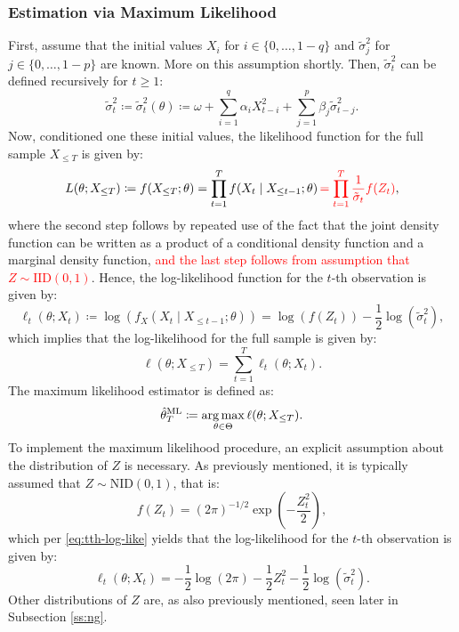 \subsubsection{Estimation via Maximum Likelihood}
First, assume that the initial values $X_{i}$ for $i\in\{0,\dots,1-q\}$ and $\tilde{\sigma}_{j}^{2}$ for $j\in\{0,\dots,1-p\}$ are known. More on this assumption shortly. Then, $\tilde{\sigma}_{t}^{2}$ can be defined recursively for $t\geq 1$:
\begin{equation}\label{eq:est-sigma}
    \tilde{\sigma}_{t}^{2}\coloneqq\tilde{\sigma}_{t}^{2}(\theta)\coloneqq\omega+\sum_{i=1}^{q}\alpha_{i}X_{t-i}^{2}+\sum_{j=1}^{p}\beta_{j}\tilde{\sigma}_{t-j}^{2}.
\end{equation}
Now, conditioned one these initial values, the likelihood function for the full sample $X_{\leq T}$ is given by:
\begin{equation*}
    L(\theta; X_{\leq T})\coloneqq f(X_{\leq T};\theta)=\prod_{t=1}^{T}f(X_{t}\mid X_{\leq t-1};\theta)\textcolor{red}{\,=\prod_{t=1}^{T}\frac{1}{\tilde{\sigma}_{t}}f(Z_{t})},
\end{equation*}
where the second step follows by repeated use of the fact that the joint density function can be written as a product of a conditional density function and a marginal density function, \textcolor{red}{and the last step follows from assumption that $Z\sim\mathrm{IID}(0,1)$}. Hence, the log-likelihood function for the $t$-th observation is given by:
\begin{equation}\label{eq:tth-log-like}
    \ell_{t}(\theta;X_{t})\coloneqq\log\left(f_{X}(X_{t}\mid X_{\leq t-1};\theta)\right)=\log(f(Z_{t}))-\frac{1}{2}\log(\tilde{\sigma}_{t}^{2}),
\end{equation}
which implies that the log-likelihood for the full sample is given by:
\begin{equation*}
    \ell(\theta;X_{\leq T})=\sum_{t=1}^{T}\ell_{t}(\theta;X_{t}).
\end{equation*}
The maximum likelihood estimator is defined as:
\begin{equation}\label{eq:garch-mle}
    \hat{\theta}_{T}^{\mathrm{ML}}\coloneqq\operatorname*{arg\,max}_{\theta\in\Theta}\ell(\theta;X_{\leq T}).
\end{equation}
To implement the maximum likelihood procedure, an explicit assumption about the distribution of $Z$ is necessary. As previously mentioned, it is typically assumed that $Z\sim\mathrm{NID}(0,1)$, that is:
\begin{equation*}
    f(Z_{t})=(2\pi)^{-1/2}\exp\left(-\frac{Z_{t}^{2}}{2}\right),
\end{equation*}
which per \eqref{eq:tth-log-like} yields that the log-likelihood for the $t$-th observation is given by:
\begin{equation}\label{eq:normal-tth-log-like}
    \ell_{t}(\theta;X_{t})=-\frac{1}{2}\log(2\pi)-\frac{1}{2}Z_{t}^{2}-\frac{1}{2}\log(\tilde{\sigma}_{t}^{2}).
\end{equation}
Other distributions of $Z$ are, as also previously mentioned, seen later in Subsection \ref{ss:ng}.

